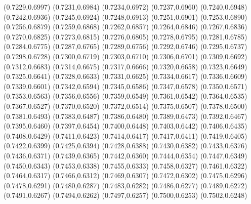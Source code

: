 \PST@Cross(0.7229,0.6997)
\PST@Cross(0.7231,0.6984)
\PST@Cross(0.7234,0.6972)
\PST@Cross(0.7237,0.6960)
\PST@Cross(0.7240,0.6948)
\PST@Cross(0.7242,0.6936)
\PST@Cross(0.7245,0.6924)
\PST@Cross(0.7248,0.6913)
\PST@Cross(0.7251,0.6901)
\PST@Cross(0.7253,0.6890)
\PST@Cross(0.7256,0.6879)
\PST@Cross(0.7259,0.6868)
\PST@Cross(0.7262,0.6857)
\PST@Cross(0.7264,0.6846)
\PST@Cross(0.7267,0.6836)
\PST@Cross(0.7270,0.6825)
\PST@Cross(0.7273,0.6815)
\PST@Cross(0.7276,0.6805)
\PST@Cross(0.7278,0.6795)
\PST@Cross(0.7281,0.6785)
\PST@Cross(0.7284,0.6775)
\PST@Cross(0.7287,0.6765)
\PST@Cross(0.7289,0.6756)
\PST@Cross(0.7292,0.6746)
\PST@Cross(0.7295,0.6737)
\PST@Cross(0.7298,0.6728)
\PST@Cross(0.7300,0.6719)
\PST@Cross(0.7303,0.6710)
\PST@Cross(0.7306,0.6701)
\PST@Cross(0.7309,0.6692)
\PST@Cross(0.7312,0.6683)
\PST@Cross(0.7314,0.6675)
\PST@Cross(0.7317,0.6666)
\PST@Cross(0.7320,0.6658)
\PST@Cross(0.7323,0.6649)
\PST@Cross(0.7325,0.6641)
\PST@Cross(0.7328,0.6633)
\PST@Cross(0.7331,0.6625)
\PST@Cross(0.7334,0.6617)
\PST@Cross(0.7336,0.6609)
\PST@Cross(0.7339,0.6601)
\PST@Cross(0.7342,0.6594)
\PST@Cross(0.7345,0.6586)
\PST@Cross(0.7347,0.6578)
\PST@Cross(0.7350,0.6571)
\PST@Cross(0.7353,0.6563)
\PST@Cross(0.7356,0.6556)
\PST@Cross(0.7359,0.6549)
\PST@Cross(0.7361,0.6542)
\PST@Cross(0.7364,0.6535)
\PST@Cross(0.7367,0.6527)
\PST@Cross(0.7370,0.6520)
\PST@Cross(0.7372,0.6514)
\PST@Cross(0.7375,0.6507)
\PST@Cross(0.7378,0.6500)
\PST@Cross(0.7381,0.6493)
\PST@Cross(0.7383,0.6487)
\PST@Cross(0.7386,0.6480)
\PST@Cross(0.7389,0.6473)
\PST@Cross(0.7392,0.6467)
\PST@Cross(0.7395,0.6460)
\PST@Cross(0.7397,0.6454)
\PST@Cross(0.7400,0.6448)
\PST@Cross(0.7403,0.6442)
\PST@Cross(0.7406,0.6435)
\PST@Cross(0.7408,0.6429)
\PST@Cross(0.7411,0.6423)
\PST@Cross(0.7414,0.6417)
\PST@Cross(0.7417,0.6411)
\PST@Cross(0.7419,0.6405)
\PST@Cross(0.7422,0.6399)
\PST@Cross(0.7425,0.6394)
\PST@Cross(0.7428,0.6388)
\PST@Cross(0.7430,0.6382)
\PST@Cross(0.7433,0.6376)
\PST@Cross(0.7436,0.6371)
\PST@Cross(0.7439,0.6365)
\PST@Cross(0.7442,0.6360)
\PST@Cross(0.7444,0.6354)
\PST@Cross(0.7447,0.6349)
\PST@Cross(0.7450,0.6343)
\PST@Cross(0.7453,0.6338)
\PST@Cross(0.7455,0.6333)
\PST@Cross(0.7458,0.6327)
\PST@Cross(0.7461,0.6322)
\PST@Cross(0.7464,0.6317)
\PST@Cross(0.7466,0.6312)
\PST@Cross(0.7469,0.6307)
\PST@Cross(0.7472,0.6302)
\PST@Cross(0.7475,0.6296)
\PST@Cross(0.7478,0.6291)
\PST@Cross(0.7480,0.6287)
\PST@Cross(0.7483,0.6282)
\PST@Cross(0.7486,0.6277)
\PST@Cross(0.7489,0.6272)
\PST@Cross(0.7491,0.6267)
\PST@Cross(0.7494,0.6262)
\PST@Cross(0.7497,0.6257)
\PST@Cross(0.7500,0.6253)
\PST@Cross(0.7502,0.6248)

